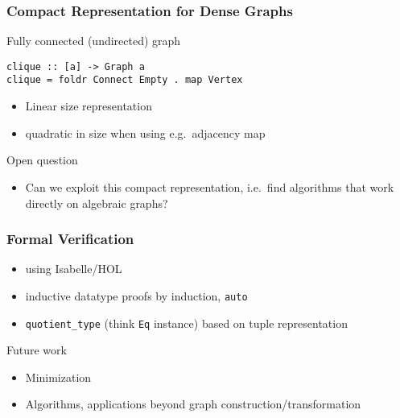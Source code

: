 \documentclass{beamer}
\newcommand{\hs}{\texttt}
\begin{document}
\begin{frame}[fragile]
  \frametitle{Compact Representation for Dense Graphs}
  \onslide<+->
  Fully connected (undirected) graph
  \begin{verbatim}
clique :: [a] -> Graph a
clique = foldr Connect Empty . map Vertex
  \end{verbatim}
  \onslide<+->
  \begin{itemize}
  \item \alert{Linear size representation}
  \item quadratic in size when using e.g.\ adjacency map
  \end{itemize}
  \onslide<+->
  \begin{exampleblock}{Open question}
    \begin{itemize}
    \item Can we exploit this compact representation, i.e.\ find algorithms that
      work directly on algebraic graphs?
    \end{itemize}
  \end{exampleblock}
\end{frame}

\begin{frame}
  \frametitle{Formal Verification}
  \begin{itemize}[<+->]
  \item using Isabelle/HOL
  \item inductive datatype \textrightarrow{} proofs by induction, \texttt{auto}
  \item \texttt{quotient\_type} (think \hs{Eq} instance) based on tuple representation
  \end{itemize}
  \onslide<+->
  \begin{exampleblock}{Future work}
    \begin{itemize}
    \item Minimization
    \item Algorithms, applications beyond graph construction/transformation
    \end{itemize}
  \end{exampleblock}
\end{frame}
\end{document}
